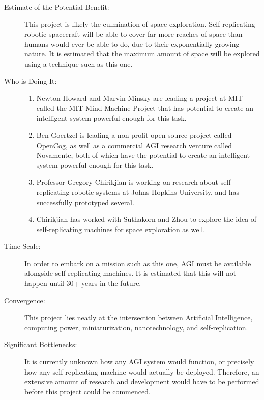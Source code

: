 \begin{description}
\item[Estimate of the Potential Benefit:]

This project is likely the culmination of space exploration. Self-replicating
robotic spacecraft will be able to cover far more reaches of space
than humans would ever be able to do, due to their exponentially growing
nature. It is estimated that the maximum amount of space will be explored
using a technique such as this one.


\item[Who is Doing It:]
\hfill
\begin{enumerate}
\item Newton Howard and Marvin Minsky are leading a project at MIT called
the MIT Mind Machine Project that has potential to create an intelligent
system powerful enough for this task\cite{mmp}.
\item Ben Goertzel is leading a non-profit open source project called OpenCog,
as well as a commercial AGI research venture called Novamente, both
of which have the potential to create an intelligent system powerful
enough for this task\cite{goertzel}.
\item Professor Gregory Chirikjian is working on research about self-replicating
robotic systems at Johns Hopkins University, and has successfully
prototyped several\cite{chirikjian}.
\item Chirikjian has worked with Suthakorn and Zhou to explore the idea
of self-replicating machines for space exploration as well\cite{chirikjian2}.
\end{enumerate}

\item[Time Scale:]

In order to embark on a mission such as this one, AGI must be available
alongside self-replicating machines. It is estimated that this will
not happen until 30+ years in the future.


\item[Convergence:]

This project lies neatly at the intersection between Artificial Intelligence,
computing power, miniaturization, nanotechnology, and self-replication.


\item[Significant Bottlenecks:]

It is currently unknown how any AGI system would function, or precisely
how any self-replicating machine would actually be deployed. Therefore,
an extensive amount of research and development would have to be performed
before this project could be commenced.

\end{description}





